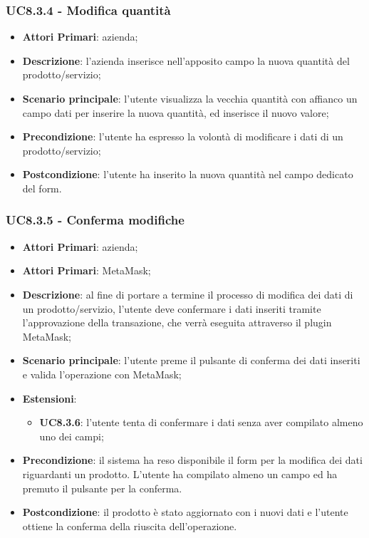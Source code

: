 \subsubsection{UC8.3.4 - Modifica quantità}
\begin{itemize}
	\item \textbf{Attori Primari}: azienda;
	\item \textbf{Descrizione}: l'azienda inserisce nell'apposito campo la nuova quantità del prodotto/servizio;
	\item \textbf{Scenario principale}: l'utente visualizza la vecchia quantità con affianco un campo dati per inserire la nuova quantità, ed inserisce il nuovo valore;
	\item \textbf{Precondizione}: l'utente ha espresso la volontà di modificare i dati di un prodotto/servizio;
	\item \textbf{Postcondizione}: l'utente ha inserito la nuova quantità nel campo dedicato del form.
\end{itemize}

\subsubsection{UC8.3.5 - Conferma modifiche}
\begin{itemize}
	\item \textbf{Attori Primari}: azienda;
	\item \textbf{Attori Primari}: MetaMask\glo;
	\item \textbf{Descrizione}: al fine di portare a termine il processo di modifica dei dati di un prodotto/servizio, l'utente deve confermare i dati inseriti tramite l'approvazione della transazione, che verrà eseguita attraverso il plugin MetaMask\glo;
	\item \textbf{Scenario principale}: l'utente preme il pulsante di conferma dei dati inseriti e valida l'operazione con MetaMask\glo;
	\item \textbf{Estensioni}:
	\begin{itemize}
		\item \textbf{UC8.3.6}: l'utente tenta di confermare i dati senza aver compilato almeno uno dei campi;
	\end{itemize}
	\item \textbf{Precondizione}: il sistema ha reso disponibile il form per la modifica dei dati riguardanti un prodotto. L'utente ha compilato almeno un campo ed ha premuto il pulsante per la conferma.
	\item \textbf{Postcondizione}: il prodotto è stato aggiornato con i nuovi dati e l'utente ottiene la conferma della riuscita dell'operazione.
\end{itemize}

